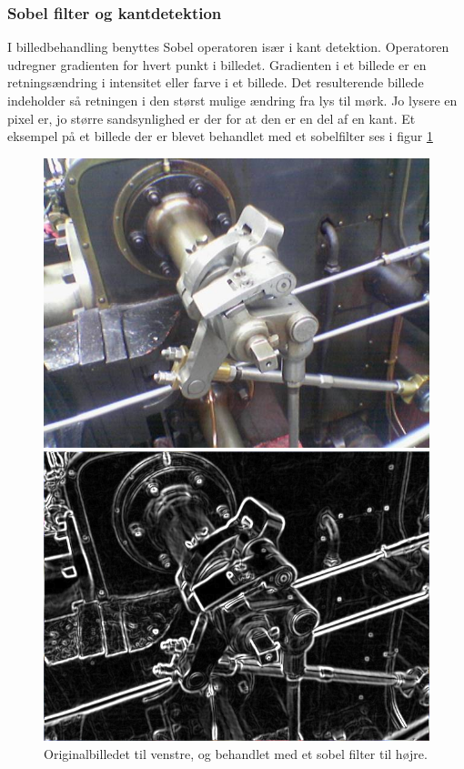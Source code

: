 \subsubsection{Sobel filter og kantdetektion}
I billedbehandling benyttes Sobel operatoren især i kant detektion. Operatoren udregner gradienten for hvert punkt i billedet. Gradienten i et billede er en retningsændring i intensitet eller farve i et billede. Det resulterende billede indeholder så retningen i den størst mulige ændring fra lys til mørk. Jo lysere en pixel er, jo større sandsynlighed er der for at den er en del af en kant. Et eksempel på et billede der er blevet behandlet med et sobelfilter ses i figur \ref{fig:premethod_sobelres}

\begin{figure}[H]
	\begin{minipage}[b]{0.5\linewidth}
		\centering
		\includegraphics[scale=0.25]{files/premethod/img/sobel1.PNG}
	\end{minipage}
	\hspace{0.5cm}
	\begin{minipage}[b]{0.5\linewidth}
		\centering
		\includegraphics[scale=0.25]{files/premethod/img/sobel2.PNG}
	\end{minipage}
	\caption{Originalbilledet til venstre, og behandlet med et sobel filter til højre.\label{fig:premethod_sobelres}}
\end{figure}

